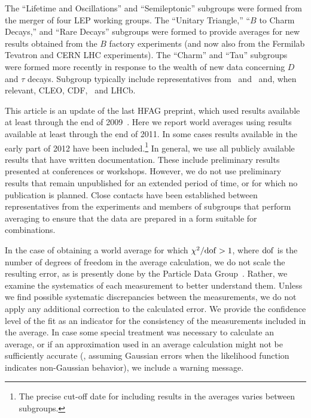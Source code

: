 The ``Lifetime and Oscillations'' and ``Semileptonic'' subgroups were formed from the merger of four LEP working groups.
The ``Unitary Triangle,'' ``$B$ to Charm Decays,'' and ``Rare Decays''
subgroups were formed to provide averages for new results obtained
from the $B$ factory experiments (and now also from the Fermilab 
Tevatron and CERN LHC experiments).
The ``Charm'' and ``Tau''  subgroups were formed more recently in 
response to the wealth of new data concerning $D$ and $\tau$ decays. 
Subgroup typically include representatives from \belle\ and \babar\ and, 
when relevant, CLEO, CDF, \dzero\ and LHCb. 

This article is an update of the last HFAG preprint,
which used results available at least through the end of 2009~\cite{Asner:2010qj}. 
Here we report world averages using results available at least through
the end of 2011. 
In some cases results available in the early part of 2012 have been
included.\footnote{
  The precise cut-off date for including results in the averages varies 
  between subgroups.}
In general, we use all publicly available results that have written documentation. 
These include preliminary results presented at conferences or workshops.
However, we do not use preliminary results that remain unpublished 
for an extended period of time, or for which no publication is planned. 
Close contacts have been established between representatives from
the experiments and members of subgroups that perform averaging 
to ensure that the data are prepared in a form suitable for 
combinations.  

In the case of obtaining a world average for which $\chi^2/{\rm dof} > 1$,
where ${\rm dof}$ is the number of degrees of freedom in the average
calculation, we do not scale the resulting error, as is presently 
done by the Particle Data Group~\cite{PDG_2010}. 
Rather, 
we examine the systematics of each measurement to better understand them. 
Unless we find possible systematic discrepancies between the measurements, 
we do not apply any additional correction to the calculated error. 
We provide the confidence level of the fit as an indicator for the 
consistency of the measurements included in the average. In case some
special treatment was necessary to calculate an average, or if an
approximation used in an average calculation might not be 
sufficiently accurate 
(\eg, assuming Gaussian errors when the likelihood function indicates 
non-Gaussian behavior), we include a warning message.

